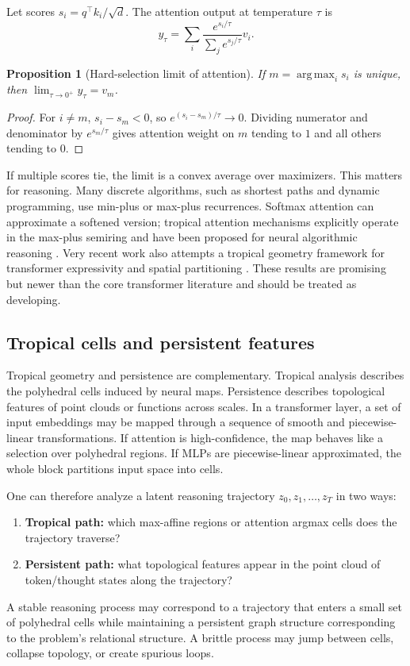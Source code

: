 \documentclass[11pt]{article}
\newtheorem{proposition}[definition]{Proposition}
\newcommand{\argmax}{\operatorname*{arg\,max}}
\newcommand{\1}{\mathbf{1}}
\begin{document}
Let scores $s_i=q^\top k_i/\sqrt d$. The attention output at temperature $\tau$ is
\[
y_\tau=\sum_i \frac{e^{s_i/\tau}}{\sum_j e^{s_j/\tau}}v_i.
\]

\begin{proposition}[Hard-selection limit of attention]
If $m=\argmax_i s_i$ is unique, then $\lim_{\tau\to0^+}y_\tau=v_m$.
\end{proposition}
\begin{proof}
For $i\ne m$, $s_i-s_m<0$, so $e^{(s_i-s_m)/\tau}\to0$. Dividing numerator and denominator by $e^{s_m/\tau}$ gives attention weight on $m$ tending to $1$ and all others tending to $0$.
\end{proof}

If multiple scores tie, the limit is a convex average over maximizers. This matters for reasoning. Many discrete algorithms, such as shortest paths and dynamic programming, use min-plus or max-plus recurrences. Softmax attention can approximate a softened version; tropical attention mechanisms explicitly operate in the max-plus semiring and have been proposed for neural algorithmic reasoning \cite{HashemiTropicalAttention2025}. Very recent work also attempts a tropical geometry framework for transformer expressivity and spatial partitioning \cite{TransformerTropical2026}. These results are promising but newer than the core transformer literature and should be treated as developing.

\subsection{Tropical cells and persistent features}

Tropical geometry and persistence are complementary. Tropical analysis describes the polyhedral cells induced by neural maps. Persistence describes topological features of point clouds or functions across scales. In a transformer layer, a set of input embeddings may be mapped through a sequence of smooth and piecewise-linear transformations. If attention is high-confidence, the map behaves like a selection over polyhedral regions. If MLPs are piecewise-linear approximated, the whole block partitions input space into cells.

One can therefore analyze a latent reasoning trajectory $z_0,z_1,\ldots,z_T$ in two ways:
\begin{enumerate}
\item \textbf{Tropical path:} which max-affine regions or attention argmax cells does the trajectory traverse?
\item \textbf{Persistent path:} what topological features appear in the point cloud of token/thought states along the trajectory?
\end{enumerate}
A stable reasoning process may correspond to a trajectory that enters a small set of polyhedral cells while maintaining a persistent graph structure corresponding to the problem's relational structure. A brittle process may jump between cells, collapse topology, or create spurious loops.
\end{document}
